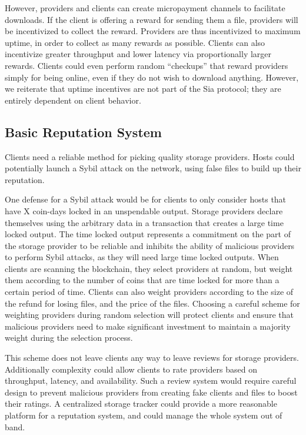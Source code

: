 \documentclass[twocolumn]{article}
\begin{document}
However, providers and clients can create micropayment channels to facilitate downloads.
If the client is offering a reward for sending them a file, providers will be incentivized to collect the reward.
Providers are thus incentivized to maximum uptime, in order to collect as many rewards as possible.
Clients can also incentivize greater throughput and lower latency via proportionally larger rewards.
Clients could even perform random ``checkups'' that reward providers simply for being online, even if they do not wish to download anything.
However, we reiterate that uptime incentives are not part of the Sia protocol; they are entirely dependent on client behavior.

\subsection{Basic Reputation System}
Clients need a reliable method for picking quality storage providers.
Hosts could potentially launch a Sybil attack on the network, using false files to build up their reputation.

One defense for a Sybil attack would be for clients to only consider hosts that have X coin-days locked in an unspendable output.
Storage providers declare themselves using the arbitrary data in a transaction that creates a large time locked output.
The time locked output represents a commitment on the part of the storage provider to be reliable and inhibits the ability of malicious providers to perform Sybil attacks, as they will need large time locked outputs.
When clients are scanning the blockchain, they select providers at random, but weight them according to the number of coins that are time locked for more than a certain period of time.
Clients can also weight providers according to the size of the refund for losing files, and the price of the files.
Choosing a careful scheme for weighting providers during random selection will protect clients and ensure that malicious providers need to make significant investment to maintain a majority weight during the selection process.

This scheme does not leave clients any way to leave reviews for storage providers.
Additionally complexity could allow clients to rate providers based on throughput, latency, and availability.
Such a review system would require careful design to prevent malicious providers from creating fake clients and files to boost their ratings.
A centralized storage tracker could provide a more reasonable platform for a reputation system, and could manage the whole system out of band.
\end{document}
